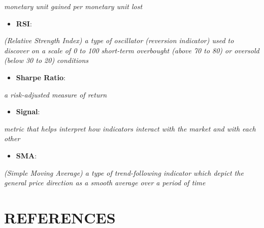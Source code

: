 \documentclass[12pt,]{article}
\providecommand{\tightlist}{%
  \setlength{\itemsep}{0pt}\setlength{\parskip}{0pt}}
\begin{document}
\emph{monetary unit gained per monetary unit lost}

\begin{itemize}
\tightlist
\item
  \textbf{RSI}:
\end{itemize}

\emph{(Relative Strength Index) a type of oscillator (reversion
indicator) used to discover on a scale of 0 to 100 short-term overbought
(above 70 to 80) or oversold (below 30 to 20) conditions}

\begin{itemize}
\tightlist
\item
  \textbf{Sharpe Ratio}:
\end{itemize}

\emph{a risk-adjusted measure of return}

\begin{itemize}
\tightlist
\item
  \textbf{Signal}:
\end{itemize}

\emph{metric that helps interpret how indicators interact with the
market and with each other}

\begin{itemize}
\tightlist
\item
  \textbf{SMA}:
\end{itemize}

\emph{(Simple Moving Average) a type of trend-following indicator which
depict the general price direction as a smooth average over a period of
time}

\pagebreak

\section{REFERENCES}\label{references}
\end{document}
